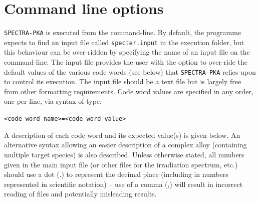 \documentclass[a4paper]{article}
\begin{document}
\section{Command line options}
\texttt{SPECTRA-PKA} is executed from the command-line. By default, the programme expects to find an input file called \texttt{specter.input} in the execution folder, but this behaviour can be over-ridden by specifying the name of an input file on the command-line. The input file provides the user with the option to over-ride the default values of the various code words (see below) that \texttt{SPECTRA-PKA} relies upon to control its execution. The input file should be a text file but is largely free from other formatting requirements. Code word values are specified in any order, one per line, via syntax of type:
\begin{center}
\texttt{<code word name>=<code word value>}
\end{center}
A description of each code word and its expected value(s) is given below. An alternative syntax allowing an easier description of a complex alloy (containing multiple target species) is also described. Unless otherwise stated, all numbers given in the main input file (or other files for the irradiation spectrum, etc.) should use a dot (.) to represent the decimal place (including in numbers represented in scientific notation) -- use of a comma (,) will result in incorrect reading of files and potentially misleading results.
\end{document}
